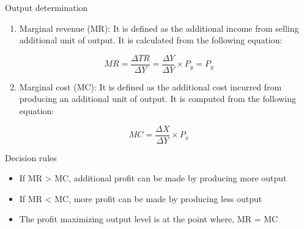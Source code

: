 \documentclass[12pt,ignorenonframetext,aspectratio=169]{beamer}
\providecommand{\tightlist}{%
  \setlength{\itemsep}{0pt}\setlength{\parskip}{0pt}}
\begin{document}
\begin{frame}{Output determination}
\protect\hypertarget{output-determination}{}
\begin{enumerate}
\tightlist
\item
  Marginal revenue (MR): It is defined as the additional income from
  selling additional unit of output. It is calculated from the following
  equation:
\end{enumerate}

\[
MR = \frac{\Delta TR}{\Delta Y} = \frac{\Delta Y}{\Delta Y}\times P_y = P_y
\]

\begin{enumerate}
\setcounter{enumi}{1}
\tightlist
\item
  Marginal cost (MC): It is defined as the additional cost incurred from
  producing an additional unit of output. It is computed from the
  following equation:
\end{enumerate}

\[
MC = \frac{\Delta X}{\Delta Y} \times P_x
\]
\end{frame}

\begin{frame}{Decision rules}
\protect\hypertarget{decision-rules-1}{}
\begin{itemize}
\tightlist
\item
  If MR \textgreater{} MC, additional profit can be made by producing
  more output
\item
  If MR \textless{} MC, more profit can be made by producing less output
\item
  The profit maximizing output level is at the point where, MR = MC
\end{itemize}
\end{frame}
\end{document}
